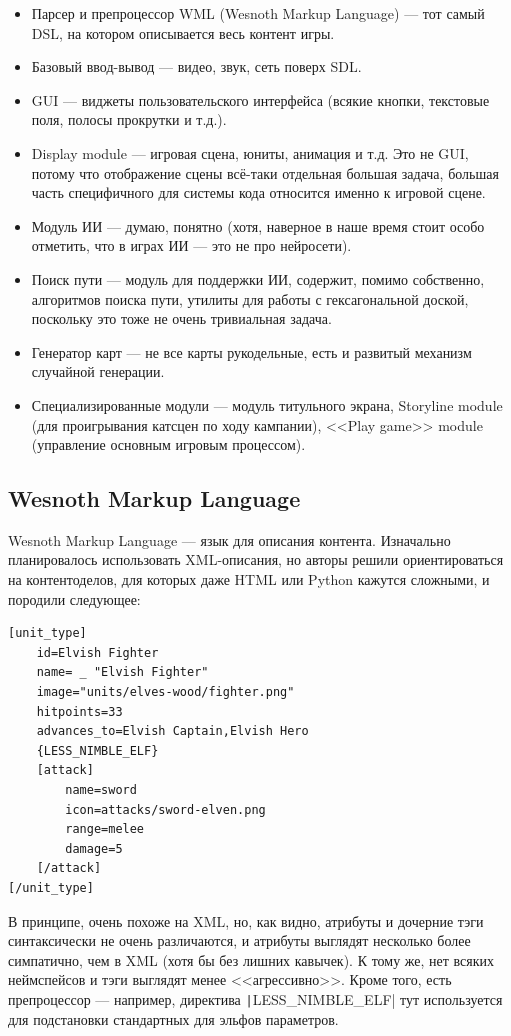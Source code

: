 \documentclass[a5paper]{article}
\begin{document}
\begin{itemize}
    \item Парсер и препроцессор WML (Wesnoth Markup Language) --- тот самый DSL, на котором описывается весь контент игры.
    \item Базовый ввод-вывод --- видео, звук, сеть поверх SDL.
    \item GUI --- виджеты пользовательского интерфейса (всякие кнопки, текстовые поля, полосы прокрутки и т.д.).
    \item Display module --- игровая сцена, юниты, анимация и т.д. Это не GUI, потому что отображение сцены всё-таки отдельная большая задача, большая часть специфичного для системы кода относится именно к игровой сцене.
    \item Модуль ИИ --- думаю, понятно (хотя, наверное в наше время стоит особо отметить, что в играх ИИ --- это не про нейросети).
    \item Поиск пути --- модуль для поддержки ИИ, содержит, помимо собственно, алгоритмов поиска пути, утилиты для работы с гексагональной доской, поскольку это тоже не очень тривиальная задача.
    \item Генератор карт --- не все карты рукодельные, есть и развитый механизм случайной генерации.
    \item Специализированные модули --- модуль титульного экрана, Storyline module (для проигрывания катсцен по ходу кампании), <<Play game>> module (управление основным игровым процессом).
\end{itemize}

\subsection{Wesnoth Markup Language}

Wesnoth Markup Language --- язык для описания контента. Изначально планировалось использовать XML-описания, но авторы решили ориентироваться на контентоделов, для которых даже HTML или Python кажутся сложными, и породили следующее:

\begin{verbatim}
[unit_type]
    id=Elvish Fighter
    name= _ "Elvish Fighter"
    image="units/elves-wood/fighter.png"
    hitpoints=33
    advances_to=Elvish Captain,Elvish Hero
    {LESS_NIMBLE_ELF}
    [attack]
        name=sword
        icon=attacks/sword-elven.png
        range=melee
        damage=5
    [/attack]
[/unit_type]
\end{verbatim}

В принципе, очень похоже на XML, но, как видно, атрибуты и дочерние тэги синтаксически не очень различаются, и атрибуты выглядят несколько более симпатично, чем в XML (хотя бы без лишних кавычек). К тому же, нет всяких неймспейсов и тэги выглядят менее <<агрессивно>>. Кроме того, есть препроцессор --- например, директива \texttt|{LESS_NIMBLE_ELF}| тут используется для подстановки стандартных для эльфов параметров.
\end{document}
